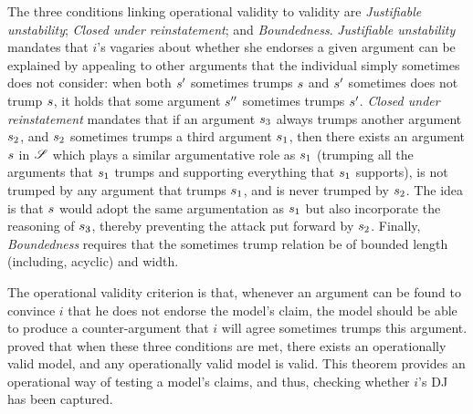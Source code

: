 \documentclass[version=3.21, pagesize, twoside=off, bibliography=totoc, DIV=calc, fontsize=12pt, a4paper, french, english]{scrartcl}
\begin{document}
The three conditions linking operational validity to validity are \emph{Justifiable unstability}; \emph{Closed under reinstatement}; and \emph{Boundedness}. \emph{Justifiable unstability} mandates that $i$’s vagaries about whether she endorses a given argument can be explained by appealing to other arguments that the individual simply sometimes does not consider: when both $s'$ sometimes trumps $s$ and $s'$ sometimes does not trump $s$, it holds that some argument $s''$ sometimes trumps $s'$. 
\emph{Closed under reinstatement} mandates that if an argument $s_3$ always trumps another argument $s_2$, and $s_2$ sometimes trumps a third argument $s_1$, then there exists an argument $s$ in $\mathscr{S}$ which plays a similar argumentative role as $s_1$ (trumping all the arguments that $s_1$ trumps and supporting everything that $s_1$ supports), is not trumped by any argument that trumps $s_1$, and is never trumped by $s_2$. The idea is that $s$ would adopt the same argumentation as $s_1$ but also incorporate the reasoning of $s_3$, thereby preventing the attack put forward by $s_2$. 
Finally, \emph{Boundedness} requires that the sometimes trump relation be of bounded length (including, acyclic) and width.

The operational validity criterion is that, whenever an argument can be found to convince $i$ that he does not endorse the model’s claim, the model should be able to produce a counter-argument that $i$ will agree sometimes trumps this argument.  proved that when these three conditions are met, there exists an operationally valid model, and any operationally valid model is valid. 
This theorem provides an operational way of testing a model’s claims, and thus, checking whether $i$’s \ac{DJ} has been captured.
\end{document}
